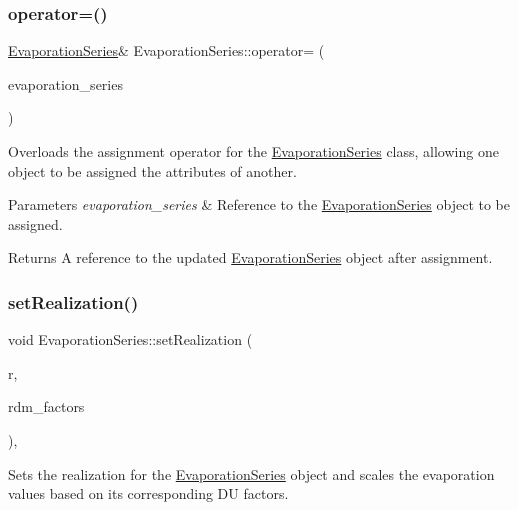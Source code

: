 \subsubsection{\texorpdfstring{operator=()}{operator=()}}
{\footnotesize\ttfamily \mbox{\hyperlink{classEvaporationSeries}{Evaporation\+Series}}\& Evaporation\+Series\+::operator= (\begin{DoxyParamCaption}\item[{const \mbox{\hyperlink{classEvaporationSeries}{Evaporation\+Series}} \&}]{evaporation\+\_\+series }\end{DoxyParamCaption})}



Overloads the assignment operator for the {\ttfamily \mbox{\hyperlink{classEvaporationSeries}{Evaporation\+Series}}} class, allowing one object to be assigned the attributes of another. 


\begin{DoxyParams}{Parameters}
{\em evaporation\+\_\+series} & Reference to the {\ttfamily \mbox{\hyperlink{classEvaporationSeries}{Evaporation\+Series}}} object to be assigned.\\
\hline
\end{DoxyParams}
\begin{DoxyReturn}{Returns}
A reference to the updated {\ttfamily \mbox{\hyperlink{classEvaporationSeries}{Evaporation\+Series}}} object after assignment. 
\end{DoxyReturn}
\mbox{\label{classEvaporationSeries_a4985ac4c81ec111657861e5750b24c0e}} 
\subsubsection{\texorpdfstring{set\+Realization()}{setRealization()}}
{\footnotesize\ttfamily void Evaporation\+Series\+::set\+Realization (\begin{DoxyParamCaption}\item[{unsigned long}]{r,  }\item[{vector$<$ double $>$ \&}]{rdm\+\_\+factors }\end{DoxyParamCaption})\hspace{0.3cm}{\ttfamily [override]}, {\ttfamily [virtual]}}



Sets the realization for the {\ttfamily \mbox{\hyperlink{classEvaporationSeries}{Evaporation\+Series}}} object and scales the evaporation values based on its corresponding DU factors. 


